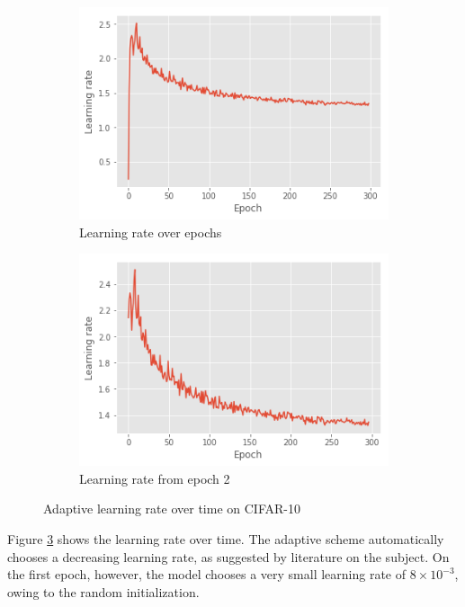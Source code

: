 \documentclass{article}
\begin{document}
\begin{figure}
    \centering
    \begin{subfigure}[b]{0.4\textwidth}
        \includegraphics[width=\linewidth]{cifar10-lr-full.png}
        \caption{Learning rate over epochs}
        \label{fig:cifar10:3a}
    \end{subfigure}
    \begin{subfigure}[b]{0.4\textwidth}
        \includegraphics[width=\linewidth]{adaptive-lr.png}
        \caption{Learning rate from epoch 2}
        \label{fig:cifar10:3b}
    \end{subfigure}
    \caption{Adaptive learning rate over time on CIFAR-10}
    \label{fig:cifar10:3}
\end{figure}

Figure \ref{fig:cifar10:3} shows the learning rate over time. The adaptive scheme automatically chooses a decreasing learning rate, as suggested by literature on the subject. On the first epoch, however, the model chooses a very small learning rate of $8 \times 10^{-3}$, owing to the random initialization. 
\end{document}
